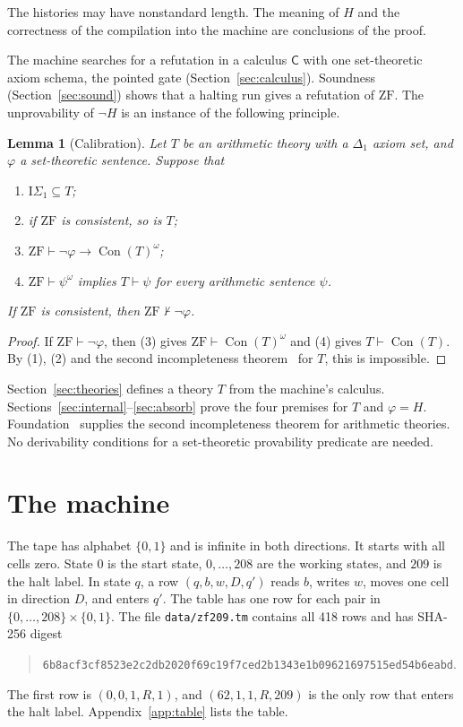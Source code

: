 \documentclass[11pt,letterpaper]{article}
\newtheorem{lemma}[theorem]{Lemma}
\newcommand{\ZF}{\mathrm{ZF}}
\newcommand{\ISig}{\mathrm{I}\Sigma_1}
\newcommand{\Con}{\operatorname{Con}}
\newcommand{\Cc}{\mathsf{C}}
\newcommand{\file}[1]{\texttt{\nolinkurl{#1}}}
\begin{document}
The histories may have nonstandard length. The meaning of $H$ and the
correctness of the compilation into the machine are conclusions of the
proof.

The machine searches for a refutation in a calculus $\Cc$ with
one set-theoretic axiom schema, the pointed gate
(Section~\ref{sec:calculus}). Soundness (Section~\ref{sec:sound}) shows
that a halting run gives a refutation of $\ZF$. The unprovability of
$\neg H$ is an instance of the following principle.

\begin{lemma}[Calibration]\label{lem:calib}
Let $T$ be an arithmetic theory with a $\Delta_1$ axiom set, and $\varphi$ a
set-theoretic sentence. Suppose that
\begin{enumerate}
\item $\ISig\subseteq T$;
\item if $\ZF$ is consistent, so is $T$;
\item $\ZF\vdash\neg\varphi\to\Con(T)^\omega$;
\item $\ZF\vdash\psi^\omega$ implies $T\vdash\psi$ for every arithmetic
  sentence $\psi$.
\end{enumerate}
If $\ZF$ is consistent, then $\ZF\nvdash\neg\varphi$.
\end{lemma}

\begin{proof}
If $\ZF\vdash\neg\varphi$, then (3) gives $\ZF\vdash\Con(T)^\omega$ and (4)
gives $T\vdash\Con(T)$. By (1), (2) and the second incompleteness
theorem~\cite{goedel} for $T$, this is impossible.
\end{proof}

Section~\ref{sec:theories} defines a theory $T$ from the machine's
calculus. Sections~\ref{sec:internal}--\ref{sec:absorb} prove the four
premises for $T$ and $\varphi=H$. Foundation~\cite{foundation} supplies
the second incompleteness theorem for arithmetic theories. No
derivability conditions for a set-theoretic provability predicate are
needed.

\section{The machine}\label{sec:machine}

The tape has alphabet $\{0,1\}$ and is infinite in both directions. It
starts with all cells zero. State $0$ is the start state, $0,\ldots,208$
are the working states, and $209$ is the halt label. In state $q$, a row
$(q,b,w,D,q')$ reads $b$, writes $w$, moves one cell in direction $D$, and
enters $q'$. The table has one row for each pair in
$\{0,\ldots,208\}\times\{0,1\}$. The file \file{data/zf209.tm} contains
all 418 rows and has SHA-256 digest
\begin{quote}\small
\nolinkurl{6b8acf3cf8523e2c2db2020f69c19f7ced2b1343e1b09621697515ed54b6eabd}.
\end{quote}
The first row is $(0,0,1,R,1)$, and $(62,1,1,R,209)$ is the only row that
enters the halt label. Appendix~\ref{app:table} lists the table.
\end{document}
